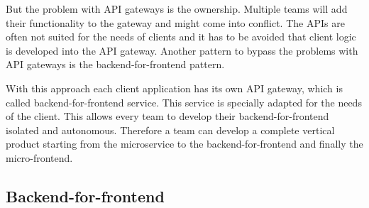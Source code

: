 But the problem with API gateways is the ownership. Multiple teams will add their functionality to the gateway and might come into conflict. The APIs are often not suited for the needs of clients and it has to be avoided that client logic is developed into the API gateway. Another pattern to bypass the problems with API gateways is the backend-for-frontend pattern. \cite{book:2018:richardson:background:bff:microservices-patterns}

With this approach each client application has its own API gateway, which is called backend-for-frontend service. This service is specially adapted for the needs of the client. \cite{book:2018:richardson:background:bff:microservices-patterns} \cite{book:2021:newman:background:bff:micro-services} This allows every team to develop their backend-for-frontend isolated and autonomous. Therefore a team can develop a complete vertical product starting from the microservice to the backend-for-frontend and finally the micro-frontend. \cite{book:2020:geers:background:micro-frontends:micro-frontends-in-action}

\subsection{Backend-for-frontend}